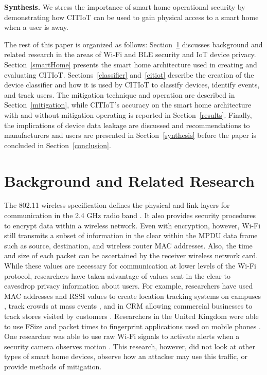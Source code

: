 \documentclass[journal]{./IEEEtran/IEEEtran}
\begin{document}
\textbf{Synthesis.} We stress the importance of smart home operational security by demonstrating how \ac{CITIoT} can be used to gain physical access to a smart home when a user is away.

The rest of this paper is organized as follows: Section~\ref{background} discusses background and related research in the areas of Wi-Fi and \ac{BLE} security and \ac{IoT} device privacy. Section~\ref{smartHome} presents the smart home architecture used in creating and evaluating \ac{CITIoT}. Sections~\ref{classifier} and~\ref{citiot} describe the creation of the device classifier and how it is used by \ac{CITIoT} to classify devices, identify events, and track users. The mitigation technique and operation are described in Section~\ref{mitigation}, while \ac{CITIoT}'s accuracy on the smart home architecture with and without mitigation operating is reported in Section~\ref{results}. Finally, the implications of device data leakage are discussed and recommendations to manufacturers and users are presented in Section~\ref{synthesis} before the paper is concluded in Section~\ref{conclusion}.

\figShaaDiagramIeee

\section{Background and Related Research}\label{background}

The 802.11 wireless specification defines the physical and link layers for communication in the 2.4 GHz radio band \cite{802.11}. It also provides security procedures to encrypt data within a wireless network. Even with encryption, however, Wi-Fi still transmits a subset of information in the clear within the \ac{MPDU} data frame such as source, destination, and wireless router \ac{MAC} addresses. Also, the time and size of each packet can be ascertained by the receiver wireless network card. While these values are necessary for communication at lower levels of the Wi-Fi protocol, researchers have taken advantage of values sent in the clear to eavesdrop privacy information about users. For example, researchers have used \ac{MAC} addresses and \ac{RSSI} values to create location tracking systems on campuses \cite{Zhou}, track crowds at mass events \cite{Bonne}, and in \ac{CRM} allowing commercial businesses to track stores visited by customers \cite{Atkinson}. Researchers in the United Kingdom were able to use \ac{FSize} and packet times to fingerprint applications used on mobile phones \cite{Atkinson}. One researcher was able to use raw Wi-Fi signals to activate alerts when a security camera observes motion \cite{Madrigal}. This research, however, did not look at other types of smart home devices, observe how an attacker may use this traffic, or provide methods of mitigation.
\end{document}

